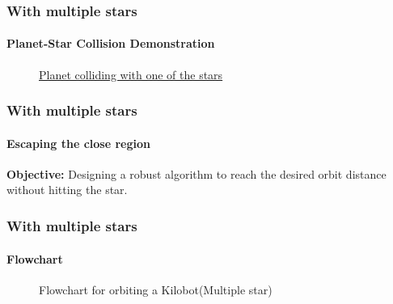 \begin{frame}
\frametitle{With multiple stars}
\framesubtitle{Planet-Star Collision Demonstration}
\begin{figure}[H]
	\centering
	\caption{\href{https://drive.google.com/file/d/1OaW0ApBvJGrLmHM_Za6CWgqYbgkAapjx/view}{Planet colliding with one of the stars}}
	\label{fig:planet-star-collision}
\end{figure}
\end{frame}

\begin{frame}
\frametitle{With multiple stars}
\framesubtitle{Escaping the close region}
\textbf{Objective:} Designing a robust algorithm to reach the desired orbit distance without hitting the star.
\end{frame}

\begin{frame}
\frametitle{With multiple stars}
\framesubtitle{Flowchart}
\begin{figure}[H]
	\centering
	\caption{Flowchart for orbiting a Kilobot(Multiple star)}
	\label{fig:Flowchart_for_orbiting_a_Kilobot(Multiple_star)}
\end{figure}
\end{frame}

